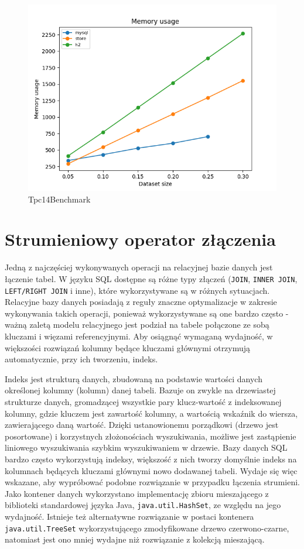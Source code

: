 \documentclass[12pt,twoside,openright]{extarticle}
\let\oldsection\section%
\renewcommand{\section}{\cleardoublepage\oldsection}%
\begin{document}
\begin{figure}[H]
\centering
\includegraphics[width=13cm]{plots/memory}
\caption{Tpc14Benchmark}
\end{figure}
    





\section{Strumieniowy operator złączenia} \label{proposal}

    Jedną z najczęściej wykonywanych operacji na relacyjnej bazie danych jest łączenie tabel. W języku SQL dostępne są różne typy złączeń (\texttt{JOIN}, \texttt{INNER JOIN}, \texttt{LEFT/RIGHT JOIN} i inne), które wykorzystywane są w różnych sytuacjach. Relacyjne bazy danych posiadają z reguły znaczne optymalizacje w zakresie wykonywania takich operacji, ponieważ wykorzystywane są one bardzo często - ważną zaletą modelu relacyjnego jest podział na tabele połączone ze sobą kluczami i więzami referencyjnymi. Aby osiągnąć wymaganą wydajność, w większości rozwiązań kolumny będące kluczami głównymi otrzymują automatycznie, przy ich tworzeniu, indeks.

    Indeks jest strukturą danych, zbudowaną na podstawie wartości danych określonej kolumny (kolumn) danej tabeli. Bazuje on zwykle na drzewiastej strukturze danych, gromadzącej wszystkie pary klucz-wartość z indeksowanej kolumny, gdzie kluczem jest zawartość kolumny, a wartością wskaźnik do wiersza, zawierającego daną wartość. Dzięki ustanowionemu porządkowi (drzewo jest posortowane) i korzystnych złożonościach wyszukiwania, możliwe jest zastąpienie liniowego wyszukiwania szybkim wyszukiwaniem w drzewie. Bazy danych SQL bardzo często wykorzystują indeksy, większość z nich tworzy domyślnie indeks na kolumnach będących kluczami głównymi nowo dodawanej tabeli. Wydaje się więc wskazane, aby wypróbować podobne rozwiązanie w przypadku łączenia strumieni. Jako kontener danych wykorzystano implementację zbioru mieszającego z biblioteki standardowej języka Java, \texttt{java.util.HashSet}, ze względu na jego wydajność. Istnieje też alternatywne rozwiązanie w postaci kontenera \texttt{java.util.TreeSet} wykorzystującego zmodyfikowane drzewo czerwono-czarne, natomiast jest ono mniej wydajne niż rozwiązanie z kolekcją mieszającą.
\end{document}
